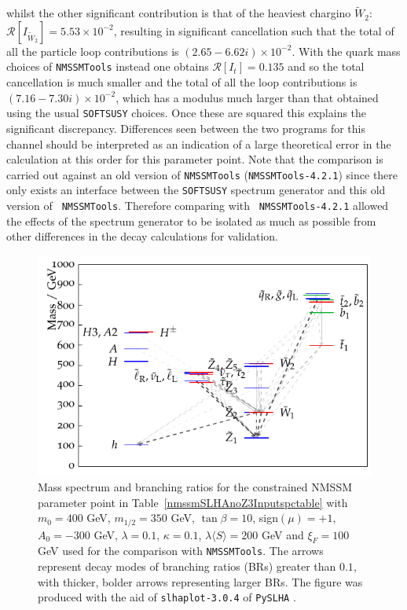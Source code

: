 \documentclass[final,3p,times]{elsarticle}
\begin{document}
whilst the other significant contribution is that of the heaviest chargino
$\tilde{W}_2$: $\mathcal{R}[I_{\tilde{W}_2}] = 5.53 \times 10^{-2}$, resulting
in significant cancellation such that the total of all the particle loop
contributions is $(2.65-6.62i) \times 10^{-2}$. With the quark mass choices of
{\tt NMSSMTools} instead one obtains $\mathcal{R}[I_t] = 0.135$ and so the
total cancellation is much smaller and the total of all the loop contributions
is $(7.16-7.30i) \times 10^{-2}$, which has a modulus much larger than that
obtained using the usual {\tt SOFTSUSY} choices. Once these are
squared this explains the significant discrepancy. Differences
seen between the two programs for this channel should be interpreted as an
indication of a large theoretical error in the calculation at this order for
this parameter point. 
Note that the comparison is carried out
against an old version of {\tt NMSSMTools} ({\tt NMSSMTools-4.2.1}) since 
there only exists an interface
between the  
{\tt SOFTSUSY} spectrum generator and this old version of {\tt
  NMSSMTools}. Therefore comparing with {\tt 
  NMSSMTools-4.2.1} allowed the effects of the spectrum 
generator to be isolated as much as possible from other differences in the
decay calculations for validation.  

\begin{figure} %
\centerline{\includegraphics[scale=1.2]{figure5}} 
\caption{Mass spectrum and branching ratios for the constrained NMSSM
  parameter point in Table~\protect\ref{nmssmSLHAnoZ3Inputspctable} with $m_0 =
  400$ GeV, $m_{1/2} = 350$ GeV, 
  $\tan\beta = 10$, sign$(\mu) = +1$, $A_0 = -300$ GeV, $\lambda = 0.1$,
  $\kappa = 
  0.1$, $\lambda \langle S \rangle = 200$ GeV and $\xi_F = 100$ GeV
used for the comparison with {\tt NMSSMTools}. The
  arrows represent decay modes of branching ratios (BRs) greater than
  $0.1$, with thicker, bolder arrows representing larger BRs. 
The figure was produced with the aid of {\tt slhaplot-3.0.4} of {\tt PySLHA}
\cite{Buckley:2013}. } \label{nmssmSLHAnoZ3Inputspectrum} 
\end{figure} 
\end{document}
